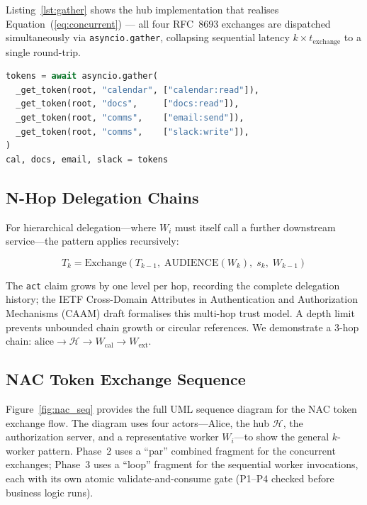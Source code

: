 \documentclass[journal]{IEEEtran}
\theoremstyle{definition}
\begin{document}
Listing~\ref{lst:gather} shows the hub implementation that realises
Equation~(\ref{eq:concurrent}) — all four RFC~8693 exchanges are dispatched
simultaneously via \texttt{asyncio.gather}, collapsing sequential latency
$k \times t_{\mathrm{exchange}}$ to a single round-trip.

\begin{lstlisting}[language=Python, label=lst:gather,
  caption={Concurrent RFC 8693 exchange (\texttt{assistant\_server.py});
  all four tokens are issued in parallel, achieving near-constant wall-clock
  overhead in $k$ workers.}]
tokens = await asyncio.gather(
  _get_token(root, "calendar", ["calendar:read"]),
  _get_token(root, "docs",     ["docs:read"]),
  _get_token(root, "comms",    ["email:send"]),
  _get_token(root, "comms",    ["slack:write"]),
)
cal, docs, email, slack = tokens
\end{lstlisting}

\subsection{N-Hop Delegation Chains}

For hierarchical delegation---where $W_i$ must itself call a further downstream
service---the pattern applies recursively:

\begin{equation}
T_k = \mathrm{Exchange}(T_{k-1},\;
  \mathrm{AUDIENCE}(W_k),\; s_k,\; W_{k-1})
\label{eq:nhop}
\end{equation}

The \texttt{act} claim grows by one level per hop, recording the complete
delegation history; the IETF Cross-Domain Attributes in Authentication and
Authorization Mechanisms (CAAM) draft \cite{ietf_caam} formalises this
multi-hop trust model. A depth limit prevents unbounded chain growth or
circular references. We demonstrate a 3-hop chain:
$\text{alice} \to \mathcal{H} \to W_{\mathrm{cal}} \to W_{\mathrm{ext}}$.

\subsection{NAC Token Exchange Sequence}

Figure~\ref{fig:nac_seq} provides the full UML sequence diagram for the NAC
token exchange flow. The diagram uses four actors---Alice, the hub
$\mathcal{H}$, the authorization server, and a representative worker
$W_i$---to show the general $k$-worker pattern. Phase~2 uses a ``par''
combined fragment for the concurrent exchanges; Phase~3 uses a ``loop''
fragment for the sequential worker invocations, each with its own
atomic validate-and-consume gate (P1--P4 checked before business logic runs).
\end{document}
